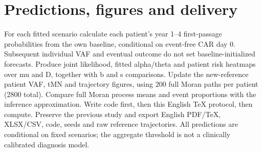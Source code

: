 \documentclass[11pt]{article}
\begin{document}
\section{Predictions, figures and delivery}
For each fitted scenario calculate each patient's year 1--4 first-passage probabilities from the own baseline, conditional on event-free CAR day 0. Subsequent individual VAF and eventual outcome do not set baseline-initialized forecasts.
Produce joint likelihood, fitted alpha/theta and patient risk heatmaps over mu and D, together with b and s comparisons. Update the new-reference patient VAF, tMN and trajectory figures, using 200 full Moran paths per patient (2800 total). Compare full Moran process means and event proportions with the inference approximation.
Write code first, then this English TeX protocol, then compute. Preserve the previous study and export English PDF/TeX, XLSX/CSV, code, seeds and raw reference trajectories. All predictions are conditional on fixed scenarios; the aggregate threshold is not a clinically calibrated diagnosis model.
\end{document}
